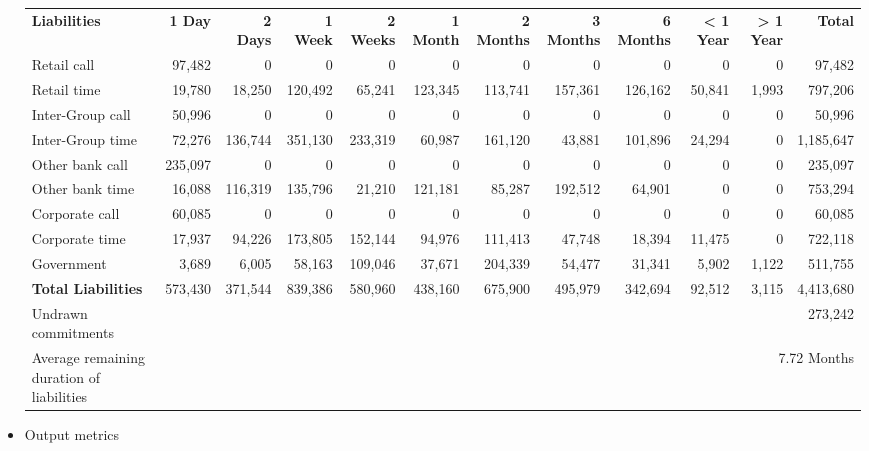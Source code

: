 \begin{itemize}
    \begin{tabular}{lrrrrrrrrrrr}

        \toprule
        \textbf{Liabilities} & \textbf{1 Day} & \textbf{2 Days} & \textbf{1 Week} & \textbf{2 Weeks} & \textbf{1 Month} & \textbf{2 Months} & \textbf{3 Months} & \textbf{6 Months} & \textbf{< 1 Year} & \textbf{> 1 Year} & \textbf{Total} \\
   

        
        Retail call          & 97{,}482   & 0       & 0        & 0       & 0       & 0        & 0        & 0        & 0        & 0        & 97{,}482 \\
        Retail time          & 19{,}780   & 18{,}250 & 120{,}492 & 65{,}241 & 123{,}345 & 113{,}741 & 157{,}361 & 126{,}162 & 50{,}841  & 1{,}993   & 797{,}206 \\
        Inter-Group call     & 50{,}996   & 0       & 0        & 0       & 0       & 0        & 0        & 0        & 0        & 0        & 50{,}996 \\
        Inter-Group time     & 72{,}276   & 136{,}744 & 351{,}130 & 233{,}319 & 60{,}987  & 161{,}120 & 43{,}881  & 101{,}896 & 24{,}294  & 0        & 1{,}185{,}647 \\
        Other bank call      & 235{,}097  & 0       & 0        & 0       & 0       & 0        & 0        & 0        & 0        & 0        & 235{,}097 \\
        Other bank time      & 16{,}088   & 116{,}319 & 135{,}796 & 21{,}210  & 121{,}181 & 85{,}287  & 192{,}512 & 64{,}901  & 0        & 0        & 753{,}294 \\
        Corporate call       & 60{,}085   & 0       & 0        & 0       & 0       & 0        & 0        & 0        & 0        & 0        & 60{,}085 \\
        Corporate time       & 17{,}937   & 94{,}226  & 173{,}805 & 152{,}144 & 94{,}976  & 111{,}413 & 47{,}748  & 18{,}394  & 11{,}475  & 0        & 722{,}118 \\
        Government           & 3{,}689    & 6{,}005   & 58{,}163  & 109{,}046 & 37{,}671  & 204{,}339 & 54{,}477  & 31{,}341  & 5{,}902   & 1{,}122   & 511{,}755 \\

        \textbf{Total Liabilities} & 573{,}430  & 371{,}544 & 839{,}386 & 580{,}960 & 438{,}160 & 675{,}900 & 495{,}979 & 342{,}694 & 92{,}512  & 3{,}115   & 4{,}413{,}680 \\
        \addlinespace
        Undrawn commitments  & \multicolumn{11}{r}{273{,}242} \\
        Average remaining duration of liabilities & \multicolumn{11}{r}{7.72 Months} \\
        \bottomrule
        \end{tabular}
\item Output metrics


\end{itemize}
